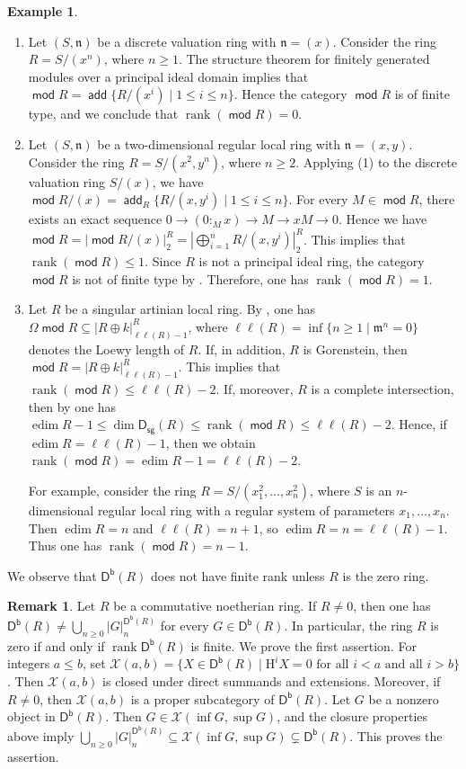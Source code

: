 \documentclass[10pt]{amsart}
\theoremstyle{definition}
\newtheorem{rem}[thm]{Remark}
\newtheorem{ex}[thm]{Example}
\theoremstyle{remark}
\numberwithin{equation}{thm}
\def\add{\operatorname{\mathsf{add}}}
\def\db{\operatorname{\mathsf{D^b}}}
\def\dim{\operatorname{dim}}
\def\ds{\operatorname{\mathsf{D_{sg}}}}
\def\edim{\operatorname{edim}}
\def\ge{\geqslant}
\def\H{\mathrm{H}}
\def\inf{\operatorname{inf}}
\def\le{\leqslant}
\def\m{\mathfrak{m}}
\def\mod{\operatorname{\mathsf{mod}}}
\def\n{\mathfrak{n}}
\def\rank{\operatorname{rank}}
\def\sup{\operatorname{sup}}
\def\X{\mathcal{X}}
\begin{document}
\begin{ex}\label{eg_rank1}
\begin{enumerate}[\rm(1)]
\item
Let $(S,\n)$ be a discrete valuation ring with $\n=(x)$.
Consider the ring $R=S/(x^n)$, where $n\ge1$.
The structure theorem for finitely generated modules over a principal ideal domain implies that $\mod R=\add\{R/(x^i)\mid1\le i\le n\}$.
Hence the category $\mod R$ is of finite type, and we conclude that $\rank(\mod R)=0$.
\item
Let $(S,\n)$ be a two-dimensional regular local ring with $\n=(x,y)$.
Consider the ring $R=S/(x^2,y^n)$, where $n\ge2$.
Applying (1) to the discrete valuation ring $S/(x)$, we have $\mod R/(x) = \add_{R}\{R/(x,y^i)\mid1\le i\le n\}$.
For every $M\in\mod R$, there exists an exact sequence $0\to (0:_{M}x)\to M\to xM\to0$.
Hence we have $\mod R={|\mod R/(x)|}_{2}^{R}={|\bigoplus_{i=1}^{n}R/(x,y^i)|}_{2}^{R}$.
This implies that $\rank(\mod R)\le1$.
Since $R$ is not a principal ideal ring, the category $\mod R$ is not of finite type by \cite[Theorem 3.3]{LW}.
Therefore, one has $\rank(\mod R)=1$.
\item
Let $R$ be a singular artinian local ring.
By \cite[Lemma 3.2]{M8}, one has $\Omega\mod R\subseteq {|R\oplus k|}_{\ell\ell(R)-1}^{R}$, where $\ell\ell(R)=\inf\{n\geq1\mid \m^{n}=0\}$ denotes the Loewy length of $R$.
If, in addition, $R$ is Gorenstein, then $\mod R={|R\oplus k|}_{\ell\ell(R)-1}^{R}$.
This implies that $\rank(\mod R)\leq \ell\ell(R)-2$.
If, moreover, $R$ is a complete intersection, then by \cite[Corollary 5.10]{BIKO2010} one has $\edim R-1\leq\dim\ds(R)\leq\rank(\mod R)\leq\ell\ell(R)-2$.
Hence, if $\edim R=\ell\ell(R)-1$, then we obtain $\rank(\mod R)=\edim R-1=\ell\ell(R)-2$.

For example, consider the ring $R=S/(x_{1}^{2},\ldots,x_{n}^{2})$, where $S$ is an $n$-dimensional regular local ring with a regular system of parameters $x_{1},\ldots,x_{n}$.
Then $\edim R=n$ and $\ell\ell(R)=n+1$, so $\edim R=n=\ell\ell(R)-1$. 
Thus one has $\rank(\mod R)=n-1$.
\end{enumerate}
\end{ex}
We observe that $\db(R)$ does not have finite rank unless $R$ is the zero ring.
\begin{rem}\label{rank_db}
Let $R$ be a commutative noetherian ring. If $R\neq0$, then
one has $\db(R)\neq\bigcup_{n\geq 0}{|G|}_{n}^{\db(R)}$ for every $G\in\db(R)$. In particular, the ring $R$ is zero if and only if $\rank\db(R)$ is finite.
We prove the first assertion. For integers $a\le b$, set $\X(a,b)=\{X\in\db(R)\mid \H^{i}X=0\text{ for all } i<a \text{ and all } i>b\}$. 
Then $\X(a,b)$ is closed under direct summands and extensions.
Moreover, if $R\neq 0$, then $\X(a,b)$ is a proper subcategory of $\db(R)$.
Let $G$ be a nonzero object in $\db(R)$.
Then $G\in \X(\inf G,\sup G)$, and the closure properties above imply $\bigcup_{n\geq 0}{|G|}_{n}^{\db(R)}\subseteq \X(\inf G,\sup G)\subsetneq \db(R)$.
This proves the assertion.
\end{rem}
\end{document}
